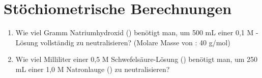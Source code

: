 \section*{Stöchiometrische Berechnungen}
\begin{enumerate}
    \item Wie viel Gramm Natriumhydroxid () benötigt man, um 500 mL einer 0,1 M -Lösung vollständig zu neutralisieren? (Molare Masse von : 40 g/mol)
    \item Wie viel Milliliter einer 0,5 M Schwefelsäure-Lösung () benötigt man, um 250 mL einer 1,0 M Natronlauge () zu neutralisieren?
\end{enumerate}
